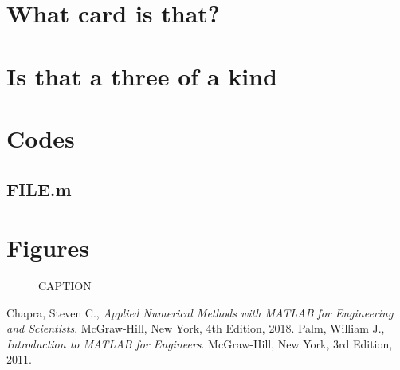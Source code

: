 \documentclass{article}
\begin{document}
\section{What card is that?}

\section{Is that a three of a kind\textinterrobang}


\pagebreak
\appendix
\section{Codes}


\subsection{FILE.m}


\clearpage %

\section{Figures}


\begin{figure}[ht!]
\begin{center}
\caption{CAPTION}
\end{center}
\end{figure}

\clearpage %

\begin{thebibliography}{9}
  Chapra, Steven C.,
  {\it Applied Numerical Methods with MATLAB for Engineering and Scientists}.
  McGraw-Hill, New York,
  4th Edition,
  2018.
  Palm, William J.,
  {\it Introduction to MATLAB for Engineers}.
  McGraw-Hill, New York,
  3rd Edition,
  2011.
\end{thebibliography}
\end{document}
